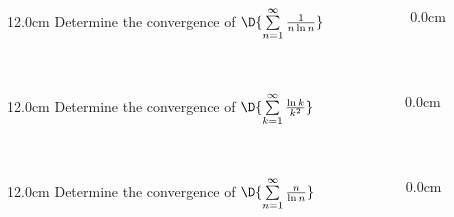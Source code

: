 \begin{frame}
\frametitle{}
\scriptsize
\begin{columns}
\begin{column}{12.0cm}
	Determine the convergence of \quad $\D{\sum \limits_{n=1}^{\infty} \frac{1}{n\ln n}}$\\
	
	\vspace{10.2cm}
\end{column}
\begin{column}{0.0cm}\end{column}
\end{columns}
\end{frame}

\begin{frame}
\frametitle{}
\scriptsize
\begin{columns}
\begin{column}{12.0cm}
	Determine the convergence of \quad $\D{\sum \limits_{k=1}^{\infty} \frac{\ln k}{k^2}}$\\
	\vspace{10.2cm}
\end{column}
\begin{column}{0.0cm}\end{column}
\end{columns}
\end{frame}

\begin{frame}
\frametitle{}
\scriptsize
\begin{columns}
\begin{column}{12.0cm}
	Determine the convergence of \quad $\D{\sum \limits_{n=1}^{\infty} \frac{n}{\ln n}}$\\
	
	\vspace{10.2cm}
\end{column}
\begin{column}{0.0cm}\end{column}
\end{columns}
\end{frame}



